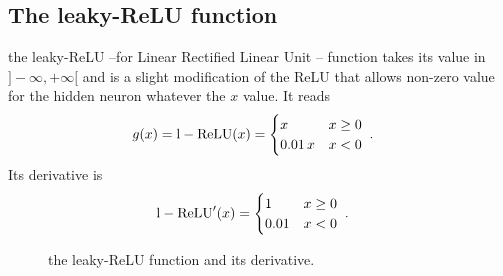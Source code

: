 \subsection{The leaky-ReLU function}


the  leaky-ReLU --for Linear Rectified Linear Unit -- function takes its value in $]-\infty,+\infty[$ and is a slight modification of the ReLU that allows non-zero value for the hidden neuron whatever the $x$ value. It reads
\begin{align}
g(x)&={\rm l-ReLU}(x)=\begin{cases} 
      x & x\geq 0 \\
      0.01\,x & x<0 
   \end{cases}\;.
\end{align}
Its derivative is
\begin{align}
{\rm l-ReLU}'(x)&=\begin{cases} 
      1 & x\geq 0 \\
      0.01 & x<0 
   \end{cases}\;.
\end{align}

\begin{figure}[H]
\begin{center}
\end{center}
\caption{\label{fig:lrelu} the leaky-ReLU function and its derivative.}
\end{figure}

